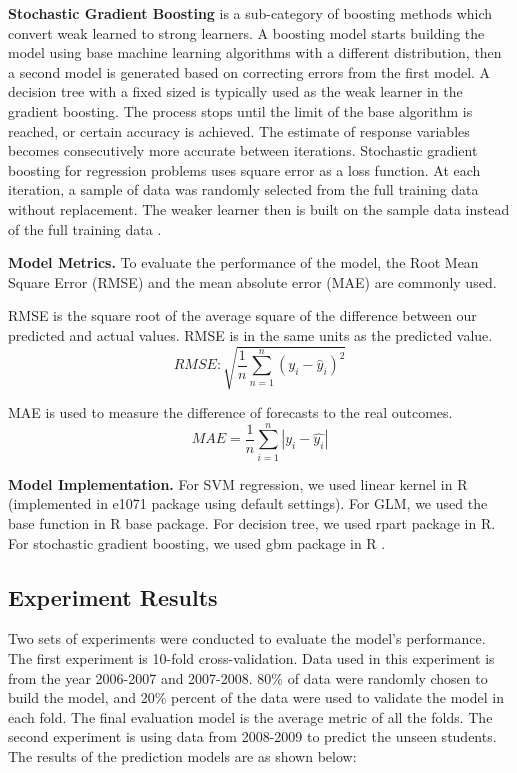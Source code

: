 \documentclass[12pt,english]{report}
\begin{document}
\vspace{0.15in}
\noindent \textbf{Stochastic Gradient Boosting} is a sub-category of boosting methods which convert weak learned to strong learners. A boosting model starts building the model using base machine learning algorithms with a different distribution, then a second model is generated based on correcting errors from the first model. A decision tree with a fixed sized is typically used as the weak learner in the gradient boosting. The process stops until the limit of the base algorithm is reached, or certain accuracy is achieved. The estimate of response variables becomes consecutively more accurate between iterations. Stochastic gradient boosting for regression problems uses square error as a loss function. At each iteration, a sample of data was randomly selected from the full training data without replacement. The weaker learner then is built on the sample data instead of the full training data \citep{FRIEDMAN2002367}. 

\vspace{0.15in}
\noindent \textbf{Model Metrics.} To evaluate the performance of the model, the Root Mean Square Error (RMSE)  and the mean absolute error (MAE) are commonly used. 

RMSE is the square root of the average square of the difference between our predicted and actual values. RMSE is in the same units as the predicted value.
\begin{equation}
RMSE:  \sqrt{\frac{1}{n}\sum_{n=1}^n (y_i-\hat{y}_i)^2}
\end{equation}

MAE is used to measure the difference of forecasts to the real outcomes.
\begin{equation}
MAE = \frac{1}{n}\sum_{i=1}^n \left| y_i - \hat{y_i}\right| 
\end{equation}

\vspace{0.15in}
\textbf{Model Implementation.} For SVM regression, we used linear kernel in R (implemented in e1071 package \citep{e1071} using default settings). For GLM, we used the base function in R base package. For decision tree, we used rpart package \citep{rpart} in R. For stochastic gradient boosting, we used  gbm package in R \citep{gbm}.

\subsection{Experiment Results}
Two sets of experiments were conducted to evaluate the model's performance. The first experiment is 10-fold cross-validation. Data used in this experiment is from the year 2006-2007 and 2007-2008.  80\% of data were randomly chosen to build the model, and 20\% percent of the data were used to validate the model in each fold. The final evaluation model is the average metric of all the folds. The second experiment is using data from 2008-2009 to predict the unseen students.  The results of the prediction models are as shown below:
\end{document}
